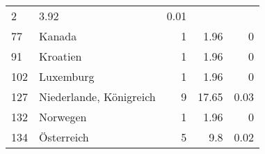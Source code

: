 \begin{longtable}{lXrrr}
       \num{2} &
       \num[round-mode=places,round-precision=2]{3,92} &
         \num[round-mode=places,round-precision=2]{0,01} \\

     77 &
     \multicolumn{1}{X}{ Kanada   } &


       \num{1} &
       \num[round-mode=places,round-precision=2]{1,96} &
         \num[round-mode=places,round-precision=2]{0} \\

     91 &
     \multicolumn{1}{X}{ Kroatien   } &


       \num{1} &
       \num[round-mode=places,round-precision=2]{1,96} &
         \num[round-mode=places,round-precision=2]{0} \\

     102 &
     \multicolumn{1}{X}{ Luxemburg   } &


       \num{1} &
       \num[round-mode=places,round-precision=2]{1,96} &
         \num[round-mode=places,round-precision=2]{0} \\

     127 &
     \multicolumn{1}{X}{ Niederlande, Königreich   } &


       \num{9} &
       \num[round-mode=places,round-precision=2]{17,65} &
         \num[round-mode=places,round-precision=2]{0,03} \\

     132 &
     \multicolumn{1}{X}{ Norwegen   } &


       \num{1} &
       \num[round-mode=places,round-precision=2]{1,96} &
         \num[round-mode=places,round-precision=2]{0} \\

     134 &
     \multicolumn{1}{X}{ Österreich   } &


       \num{5} &
       \num[round-mode=places,round-precision=2]{9,8} &
         \num[round-mode=places,round-precision=2]{0,02} \\


\end{longtable}
